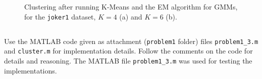 \documentclass[paper=a4, fontsize=11pt]{scrartcl} %
\numberwithin{equation}{section} %
\numberwithin{figure}{section} %
\numberwithin{table}{section} %
\newcommand{\vertbreak}{\vspace{1.75 mm}}
\begin{document}
\begin{figure}[H]
    \centering



    \cprotect\caption{Clustering after running K-Means and the EM algorithm 
        for GMMs, for the \verb+joker1+ dataset, $K = 4$ (a) and 
        $K = 6$ (b).}
    \label{fig:1-2}

\end{figure}

\subsection{}
\label{subsec:1-3}

Use the MATLAB code given as attachment (\verb+problem1+ folder) files 
\verb+problem1_3.m+ and \verb+cluster.m+ for implementation details. Follow the 
comments on the code for details and reasoning. The MATLAB 
file \verb+problem1_3.m+ was used for testing the implementations.\vertbreak
\end{document}

